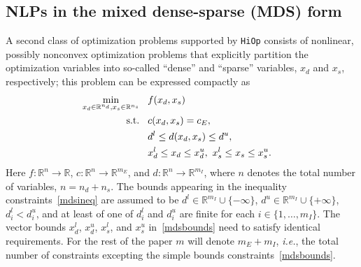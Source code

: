 \documentclass[11pt]{article}
\newcounter{line}
\newcommand{\Hi}{\texttt{HiOp}\xspace}
\begin{document}


\subsection{NLPs in the mixed dense-sparse (MDS) form}\label{sec:mds}
A second class of optimization problems supported by \Hi consists of nonlinear, possibly nonconvex optimization problems that explicitly partition the optimization variables into so-called ``dense'' and ``sparse'' variables, $x_d$ and $x_s$, respectively; this problem can be  expressed compactly as
\begin{align}
\min_{x_d\in\mathbb{R}^{n_d}, x_s\in\mathbb{R}^{n_s}} & \hspace{0.3cm} f(x_d, x_s) && \label{mdsobj}\\
\textnormal{s.t.} &\hspace{0.3cm}  c(x_d, x_s)=c_E, &&\\
 &\hspace{0.3cm} d^l \leq d(x_d, x_s) \leq d^u,  &&\label{mdsineq} \\
 &\hspace{0.3cm} x^{l}_{d} \leq x_d \leq x^{u}_{d}, \ x^{l}_{s} \leq x_s \leq x^{u}_{s}. &&\label{mdsbounds}
\end{align}
Here $f:\mathbb{R}^n\rightarrow\mathbb{R}$, $c:\mathbb{R}^n\rightarrow\mathbb{R}^{m_E}$, and $d:\mathbb{R}^n\rightarrow\mathbb{R}^{m_I}$, where $n$ denotes the total number of variables, $n=n_d + n_s$. The bounds appearing in the inequality constraints~\eqref{mdsineq} are assumed to be $d^l\in\mathbb{R}^{m_I}\cup\{-\infty\}$, $d^u\in\mathbb{R}^{m_I}\cup\{+\infty\}$, $d_i^l < d_i^u$, and at least of one of $d_i^l$ and $d_i^u$ are finite for each $i\in\{1,\ldots,m_I\}$. The vector bounds $x^{l}_{d}$, $x^{u}_{d}$, $x^{l}_{s}$, and $x^{u}_{s}$ in~\eqref{mdsbounds} need to satisfy identical requirements.  
For the rest of the paper $m$ will denote $m_E+m_I$, \textit{i.e.}, the total number of constraints excepting the simple bounds constraints~\eqref{mdsbounds}.
\end{document}
